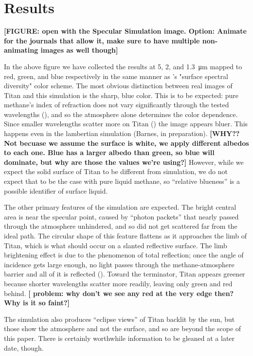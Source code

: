 \documentclass{article}
\begin{document}
\section{Results}
\textbf{\color{red} [FIGURE: open with the Specular Simulation image. Option: Animate for the journals that allow it, make sure to have multiple non-animating images as well though] \color{black}}

In the above figure we have collected the results at 5, 2, and \qty{1.3}{\micro\meter} mapped to red, green, and blue respectively in the same manner as \cite{Barnes2018}'s "surface spectral diversity" color scheme. The most obvious distinction between real images of Titan and this simulation is the sharp, blue color. This is to be expected: pure methane's index of refraction does not vary significantly through the tested wavelengths (\cite{Martonchik1994}), and so the atmosphere alone determines the color dependence. Since smaller wavelengths scatter more on Titan (\cite{EsSayeh2023}) the image appears bluer. This happens even in the lambertian simulation (Barnes, in preparation). \textbf{\color{red} [WHY?? Not becuase we assume the surface is white, we apply different albedos to each one. Blue has a larger albedo than green, so blue will dominate, but why are those the values we're using?] \color{black}} However, while we expect the solid surface of Titan to be different from simulation, we do not expect that to be the case with pure liquid methane, so ``relative blueness'' is a possible identifier of surface liquid. 

The other primary features of the simulation are expected. The bright central area is near the specular point, caused by ``photon packets'' that nearly passed through the atmosphere unhindered, and so did not get scattered far from the ideal path. The circular shape of this feature flattens as it approaches the limb of Titan, which is what should occur on a slanted reflective surface. The limb brightening effect is due to the phenomenon of total reflection; once the angle of incidence gets large enough, no light passes through the methane-atmosphere barrier and all of it is reflected (). Toward the terminator, Titan appears greener because shorter wavelengths scatter more readily, leaving only green and red behind. \textbf{\color{red}[ problem: why don't we see any red at the very edge then? Why is it so faint?]\color{black}} 

The simulation also produces ``eclipse views'' of Titan backlit by the sun, but those show the atmosphere and not the surface, and so are beyond the scope of this paper. There is certainly worthwhile information to be gleaned at a later date, though. 
\end{document}
